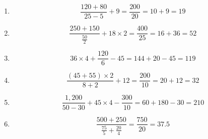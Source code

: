 \documentclass{article}
\begin{document}
\begin{enumerate}
    \item
    \[
    \frac{120 + 80}{25 - 5} + 9 = \frac{200}{20} = 10 + 9 = 19
    \]
    \item
    \[
    \frac{250 + 150}{\frac{50}{2}} + 18 \times 2 = \frac{400}{25} = 16 + 36 = 52
    \]
    \item
    \[
    36 \times 4 + \frac{120}{6} - 45 = 144 + 20 - 45 = 119
    \]
    \item
    \[
    \frac{(45 + 55) \times 2}{8 + 2} + 12 = \frac{200}{10} = 20 + 12 = 32
    \]
    \item
    \[
    \frac{1,200}{50 - 30} + 45 \times 4 - \frac{300}{10} = 60 + 180 - 30 = 210
    \]
    \item
    \[
    \frac{500 + 250}{\frac{75}{5} + \frac{20}{4}} = \frac{750}{20} = 37.5
    \]
\end{enumerate}
\end{document}
